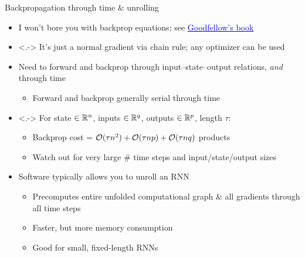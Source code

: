 \begin{frame}{Backpropagation through time \& unrolling}
    \begin{itemize}
        \item<+-> I won't bore you with backprop equations; see \href{http://www.deeplearningbook.org}{\textcolor{blue}{Goodfellow's book}}
        \item<.-> It's just a normal gradient via chain rule; any optimizer can be used
        \item<+-> Need to forward and backprop through input--state--output relations, \emph{and} through time
        \begin{itemize}
            \item Forward and backprop generally serial through time
        \end{itemize}
        \item<.-> For state $\in \mathbb{R}^n$, inputs $\in \mathbb{R}^q$, outputs $\in \mathbb{R}^p$, length $\tau$:
        \begin{itemize}
            \item Backprop cost = $\mathcal{O}(\tau n^2) + \mathcal{O}(\tau n p) + \mathcal{O}(\tau n q)$ products
            \item Watch out for very large \# time steps and input/state/output sizes
        \end{itemize}
        \item<+-> Software typically allows you to \alert{unroll} an RNN{}
        \begin{itemize}
            \item Precomputes entire unfolded computational graph \& all gradients through all time steps
            \item Faster, but more memory consumption
            \item Good for small, fixed-length RNN{}s
        \end{itemize}
    \end{itemize}
\end{frame}

